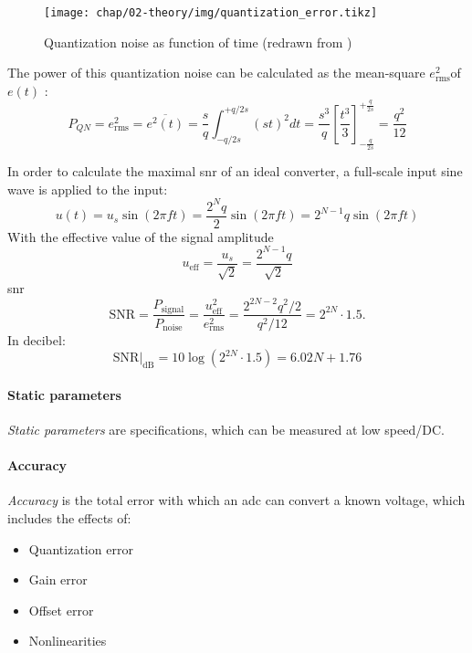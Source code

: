 \begin{figure}[tbh]
	\centering
	\texttt{[image: chap/02-theory/img/quantization\_error.tikz]}
	\caption{Quantization noise as function of time (redrawn from \cite{walt})}
	\label{fig:eq}
\end{figure}

The power of this quantization noise can be calculated as the mean-square $e_{\text{rms}}^2$of $e(t)$ \cite{walt}:
\begin{equation}
	P_{QN} = e_{\text{rms}}^{2} = \overline{e^{2}(t)} = \frac{s}{q}\int_{-q/2s}^{+q/2s} (st)^{2} dt = \frac{s^3}{q} \left[ \frac{t^3}{3}\right]_{-\frac{q}{2s}}^{+\frac{q}{2s}} = \frac{q^2}{12}
\end{equation}

In order to calculate the maximal \gls{snr} of an ideal converter, a full-scale input sine wave is applied to the input:
\begin{equation}
	u(t) = u_s \sin(2\pi f t) = \frac{2^{N}q}{2}\sin(2\pi f t)  = 2^{N-1}q \sin(2\pi f t)
\end{equation}
With the effective value of the signal amplitude
\begin{equation}
	u_{\text{eff}} = \frac{u_s}{\sqrt{2}} = \frac{2^{N-1}q}{\sqrt{2}}
\end{equation}
\gls{snr}
\begin{equation}
	\text{SNR} = \frac{P_{\text{signal}}}{P_{\text{noise}}} = \frac{u_{\text{eff}}^{2}}{e_{\text{rms}}^{2}} = \frac{2^{2N-2}q^2/2}{q^2/12} = 2^{2N} \cdot 1.5.
\end{equation}
In decibel:
\begin{equation}\label{eq:idealSNR}
	\text{SNR}|_{\text{dB}} = 10\log\left(2^{2N}\cdot 1.5\right) = 6.02 N + 1.76
\end{equation}
\cite{puente2015} \cite{walt}



\paragraph{Static parameters}
\textit{Static parameters} are specifications, which can be measured at low speed/DC. 
\paragraph{Accuracy}
\textit{Accuracy} is the total error with which an \gls{adc} can convert a known voltage, which includes the effects of:
\begin{itemize}[noitemsep]
	\item Quantization error
	\item Gain error
	\item Offset error
	\item Nonlinearities
\end{itemize}
\cite{Lundberg}
